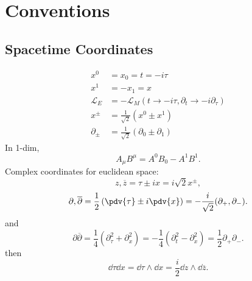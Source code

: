 \documentclass[twoside,symmetric, openany, 12pt]{./tuftebook}
\theoremstyle{definition}
\theoremstyle{definition}
\theoremstyle{definition}
\begin{document}
\iffalse
	\newgeometry{margin=1in}
	\begin{titlepage}
		{\begingroup%
			\centering
			{\Large Notes in}\\[\baselineskip]
			{\Huge\bfseries Field Theory}\\[\baselineskip]
			{\LARGE By}\\[\baselineskip]
			{\LARGE Jun Wei Tan}\par
			\vfill
			{Julius-Maximilians-Universit\"{a}t W\"{u}rzburg}
			\vfill
			{\small\sffamily \href{mailto:jun-wei.tan@stud-mail.uni-wuerzburg.de}{jun-wei.tan@stud-mail.uni-wuerzburg.de}}\par
			\endgroup}
	\end{titlepage}
	\restoregeometry
	\tableofcontents
\fi
\chapter{Conventions}
\section{Spacetime Coordinates}
\begin{align*}
	x^0 &= x_0 = t = -i\tau \\
	x^1 &= -x_1 = x\\
	\mathcal{L}_E &= - \mathcal{L}_M(t \to -i\tau, \partial_t \to -i\partial_\tau)\\
	x^{\pm} &= \frac{1}{\sqrt{2} }(x^0 \pm x^1) \\
	\partial_{\pm} &= \frac{1}{\sqrt{2} }(\partial_0 \pm \partial_1)
\end{align*}
In 1-dim,
\[
A_\mu B^\mu = A^0B_0 - A^1 B^1
.\] 
Complex coordinates for euclidean space:
\[
z, \overline{z}=\tau \pm ix = i\sqrt{2} x^\pm
,\]
\[
	\partial, \overline{\partial}=\frac{1}{2}\left( \pdv{\tau}\pm i\pdv{x} \right)=-\frac{i}{\sqrt{2} }(\partial_+, \partial_-) 
.\] 
and
\[
\partial \overline{\partial}=\frac{1}{4}(\partial_\tau^2+\partial_x^2)=-\frac{1}{4}(\partial_t^2 - \partial_x^2)=\frac{1}{2}\partial_+ \partial_-
.\] 
then
\[
	\dd{\tau}\dd{x}=\dd{\tau}\wedge \dd{x} = \frac{i}{2}\dd{z}\wedge \dd{\overline{z}}
.\] 
\end{document}
